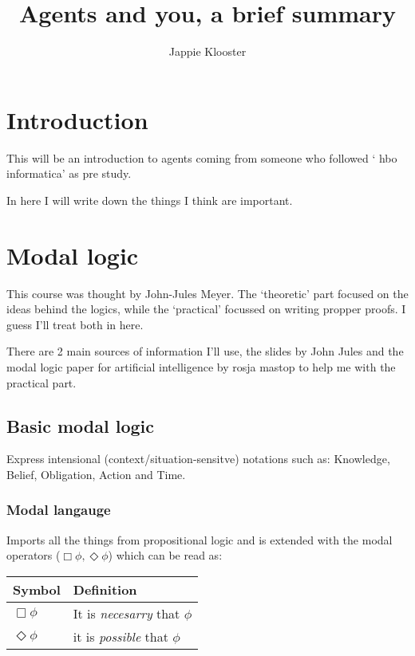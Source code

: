 \documentclass{article}
\begin{document}
\lstset{language=Java}
\author{Jappie Klooster}
\title{Agents and you, a brief summary}
\maketitle

\section{Introduction}
This will be an introduction to agents coming from someone who followed
` hbo informatica' as pre study.

In here I will write down the things I think are important.

\section{Modal logic}

This course was thought by John-Jules Meyer. The `theoretic' part focused
on the ideas behind the logics, while the `practical' focussed on writing
propper proofs. I guess I'll treat both in here.

There are 2 main sources of information I'll use, the slides by John Jules
and the modal logic paper for artificial intelligence by rosja mastop to help
me with the practical part. 

\subsection{Basic modal logic}
Express intensional (context/situation-sensitve) notations such as: 
Knowledge, Belief, Obligation, Action and Time.

\subsubsection{Modal langauge}

Imports all the things from propositional logic and is extended
with the modal operators ($\Box\phi,\Diamond\phi$) which can be read as:

\begin{tabular}{ll}
	Symbol & Definition \\ \toprule
	$\Box\phi$ & It is \emph{necesarry} that $\phi$ \\
	$\Diamond\phi$ & it is \emph{possible} that $\phi$

\end{tabular}
\end{document}
